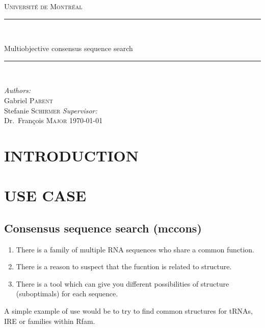 \documentclass[a4paper, 12pt] {article}
\newcommand{\HRule}{\rule{\linewidth}{0.5mm}}
\begin{document}

\begin{titlepage}
\begin{center}
\textsc{\LARGE Université de Montréal}\\[1.5cm]

\HRule \\[0.4cm]

{\huge Multiobjective consensus sequence search
\HRule \\[0.4cm]}
\vfill
\emph{Authors:}\\
Gabriel \textsc{Parent}\\
Stefanie \textsc {Schirmer}
\vfill
\emph{Supervisor:} \\
Dr.~François \textsc{Major}
\vfill
{\large \today}
\end{center}
\end{titlepage}



\section*{INTRODUCTION}

\noindent
\section*{USE CASE}
\subsection*{Consensus sequence search (mccons)}
\begin{enumerate}
  \item There is a family of multiple RNA sequences who share a common function.
  \item There is a reason to suspect that the fucntion is related to structure. 
  \item There is a tool which can give you different possibilities of structure (suboptimals) for each sequence.
\end{enumerate}
A simple example of use would be to try to find common structures for tRNAs, IRE or families within Rfam.
\end{document}
